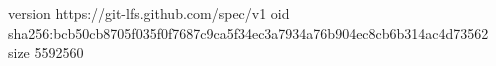 version https://git-lfs.github.com/spec/v1
oid sha256:bcb50cb8705f035f0f7687c9ca5f34ec3a7934a76b904ec8cb6b314ac4d73562
size 5592560
